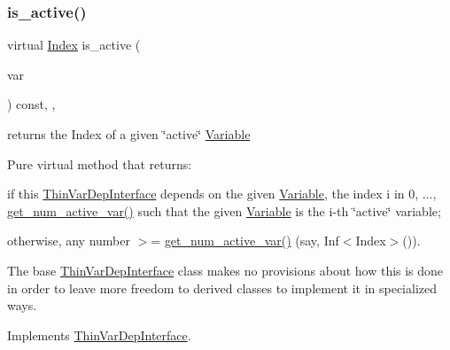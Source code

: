 \subsubsection{\texorpdfstring{is\+\_\+active()}{is\_active()}}
{\footnotesize\ttfamily virtual \mbox{\hyperlink{group___thin_var_dep_interface___c_l_a_s_s_e_s_gad53d6229d7ec28555a9c9c2fd9abf773}{Index}} is\+\_\+active (\begin{DoxyParamCaption}\item[{const \mbox{\hyperlink{class_s_m_spp__di__unipi__it_1_1_variable}{Variable}} $\ast$const}]{var }\end{DoxyParamCaption}) const\hspace{0.3cm}{\ttfamily [inline]}, {\ttfamily [override]}, {\ttfamily [virtual]}}



returns the Index of a given \char`\"{}active\char`\"{} \mbox{\hyperlink{class_s_m_spp__di__unipi__it_1_1_variable}{Variable}} 

Pure virtual method that returns\+:


\begin{DoxyItemize}
\item if this \mbox{\hyperlink{class_s_m_spp__di__unipi__it_1_1_thin_var_dep_interface}{Thin\+Var\+Dep\+Interface}} depends on the given \mbox{\hyperlink{class_s_m_spp__di__unipi__it_1_1_variable}{Variable}}, the index i in 0, ..., \mbox{\hyperlink{class_s_m_spp__di__unipi__it_1_1_f_real_objective_acc8ac3c57cc2c71ac3fe6c409fe53074}{get\+\_\+num\+\_\+active\+\_\+var()}} such that the given \mbox{\hyperlink{class_s_m_spp__di__unipi__it_1_1_variable}{Variable}} is the i-\/th \char`\"{}active\char`\"{} variable;
\item otherwise, any number $>$= \mbox{\hyperlink{class_s_m_spp__di__unipi__it_1_1_f_real_objective_acc8ac3c57cc2c71ac3fe6c409fe53074}{get\+\_\+num\+\_\+active\+\_\+var()}} (say, Inf$<$\+Index$>$()).
\end{DoxyItemize}

The base \mbox{\hyperlink{class_s_m_spp__di__unipi__it_1_1_thin_var_dep_interface}{Thin\+Var\+Dep\+Interface}} class makes no provisions about how this is done in order to leave more freedom to derived classes to implement it in specialized ways. 

Implements \mbox{\hyperlink{group___thin_var_dep_interface___c_l_a_s_s_e_s_ga05297a4e506f89ec692a01aca971ce2d}{Thin\+Var\+Dep\+Interface}}.

\mbox{\label{class_s_m_spp__di__unipi__it_1_1_f_real_objective_a59a9fcbf8f9f86d348344b2073644b0e}} 
